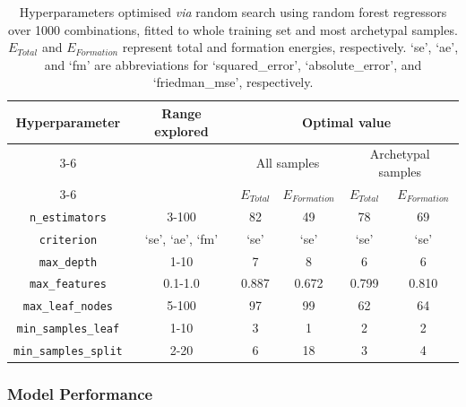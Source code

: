 \documentclass{WileyMSP-template}
\newcommand{\revision}[1]{{\color{red}#1}}
\begin{document}
\begin{table}[hp!]
    \caption{Hyperparameters optimised \textit{via} random search using random forest regressors over 1000 combinations, fitted to whole training set and most archetypal samples. $E_{Total}$ and $E_{Formation}$ represent total and formation energies, respectively. `se', `ae', and `fm' are abbreviations for `squared\_error', `absolute\_error', and `friedman\_mse', respectively.}
    \centering
    \small
    \begin{tabular}{c|c|cc|cc}
        \hline
        Hyperparameter               &   Range explored &                                        \multicolumn{4}{c}{Optimal value} \\
        \cline{3-6}
                                     &                  & \multicolumn{2}{c}{All samples} & \multicolumn{2}{c}{Archetypal samples} \\
        \cline{3-6}
                                     &                  &  $E_{Total}$ &  $E_{Formation}$ &     $E_{Total}$ &      $E_{Formation}$ \\
        \hline
        \texttt{n\_estimators}       &            3-100 &           82 &      \revision{49} &              78 &        \revision{69} \\
        \texttt{criterion}           & `se', `ae', `fm' &         `se' &    \revision{`se'} &            `se' &      \revision{`se'} \\
        \texttt{max\_depth}          &             1-10 &            7 &                8 &               6 &         \revision{6} \\
        \texttt{max\_features}       &          0.1-1.0 &        0.887 &  \revision{0.672} &           0.799 &     \revision{0.810} \\
        \texttt{max\_leaf\_nodes}    &            5-100 &           97 &      \revision{99} &              62 &        \revision{64} \\
        \texttt{min\_samples\_leaf}  &             1-10 &            3 &       \revision{1} &               2 &         \revision{2} \\
        \texttt{min\_samples\_split} &             2-20 &            6 &      \revision{18} &               3 &         \revision{4} \\
        \hline
    \end{tabular}
    \label{tab:RFoptimisedHP}
\end{table}

\subsubsection{Model Performance}
\label{sec:modelPerformance}
\end{document}
